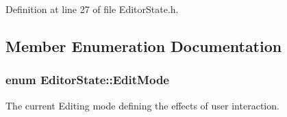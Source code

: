 Definition at line 27 of file Editor\-State.\-h.



\subsection{Member Enumeration Documentation}
\hypertarget{class_editor_state_a30123e595784b2228edc2a0c2b46ab28}{
\subsubsection[{Edit\-Mode}]{\setlength{\rightskip}{0pt plus 5cm}enum {\bf Editor\-State\-::\-Edit\-Mode}}}\label{class_editor_state_a30123e595784b2228edc2a0c2b46ab28}


The current Editing mode defining the effects of user interaction. 


